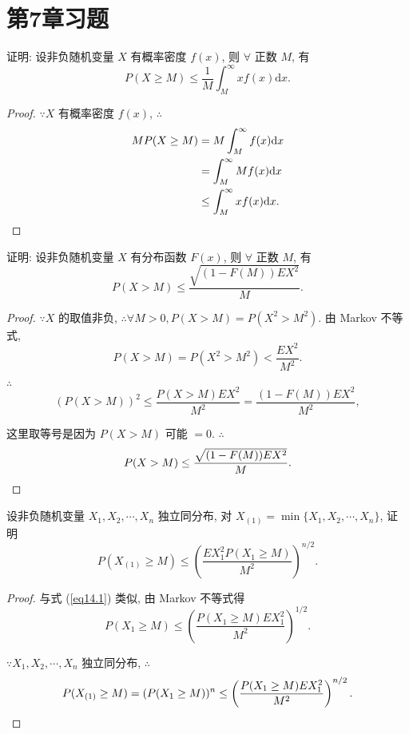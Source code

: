 \documentclass[color=black,device=normal,lang=cn]{elegantnote}
\numberwithin{equation}{section}
\theoremstyle{plain}
\newcounter{exsection}[section]
\numberwithin{exercise}{exsection}
\begin{document}
\section{第7章习题}
\addtocounter{exsection}{7}
\begin{exercise}%
    证明: 设非负随机变量 $X$ 有概率密度 $f(x)$, 则 $\forall$ 正数 $M$, 有
    \[P(X\geq M)\leq\dfrac{1}{M}\int_M^\infty xf(x)\mathrm{d}x.\]
\end{exercise}
\begin{proof}
    $\because X$ 有概率密度 $f(x)$, $\therefore$
    \begin{align*}
        MP(X\geq M) & =M\int_M^\infty f(x)\mathrm{d}x \\
        & =\int_M^\infty Mf(x)\mathrm{d}x \\
        & \leq\int_M^\infty xf(x)\mathrm{d}x.\qedhere
    \end{align*}
\end{proof}
\begin{exercise}%
    证明: 设非负随机变量 $X$ 有分布函数 $F(x)$, 则 $\forall$ 正数 $M$, 有
    \[P(X>M)\leq\dfrac{\sqrt{(1-F(M))EX^2}}{M}.\]
\end{exercise}
\begin{proof}
    $\because X$ 的取值非负, $\therefore\forall M>0,P(X>M)=P(X^2>M^2)$. 由 Markov 不等式,
    \[P(X>M)=P(X^2>M^2)<\dfrac{EX^2}{M^2}.\]

    $\therefore$
    \begin{equation}\label{eq14.1}
        (P(X>M))^2\leq\dfrac{P(X>M)EX^2}{M^2}=\dfrac{(1-F(M))EX^2}{M^2},
    \end{equation}

    这里取等号是因为 $P(X>M)$ 可能 $=0$. $\therefore$
    \[P(X>M)\leq\dfrac{\sqrt{(1-F(M))EX^2}}{M}.\qedhere\]
\end{proof}
\begin{exercise}%
    设非负随机变量 $X_1,X_2,\cdots,X_n$ 独立同分布, 对 $X_{(1)}=\min\{X_1,X_2,\cdots,X_n\}$, 证明
    \[P(X_{(1)}\geq M)\leq\left(\dfrac{EX_1^2P(X_1\geq M)}{M^2}\right)^{n/2}.\]
\end{exercise}
\begin{proof}
    与式 (\ref{eq14.1}) 类似, 由 Markov 不等式得
    \[P(X_1\geq M)\leq\left(\dfrac{P(X_1\geq M)EX_1^2}{M^2}\right)^{1/2}.\]

    $\because X_1,X_2,\cdots,X_n$ 独立同分布, $\therefore$
    \[P(X_{(1)}\geq M)=(P(X_1\geq M))^n\leq\left(\dfrac{P(X_1\geq M)EX_1^2}{M^2}\right)^{n/2}.\qedhere\]
\end{proof}
\end{document}
